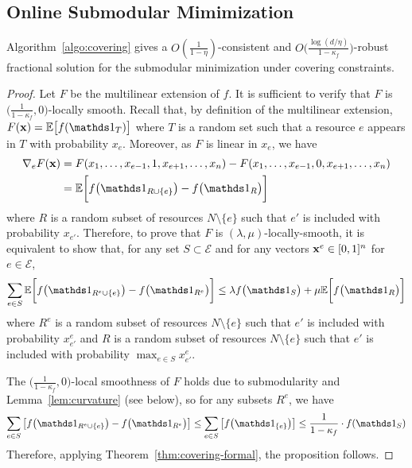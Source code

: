 \subsection{Online Submodular Mimimization}	\label{apix:sub-min}


\begin{proposition}
Algorithm~\ref{algo:covering} gives a
$O(\frac{1}{1 - \eta})$-consistent and $O\bigl( \frac{\log (d/\eta)}{1 - \kappa_{f}} \bigr)$-robust fractional  solution
for the submodular minimization under covering constraints.
\end{proposition}
\begin{proof}
Let $F$ be the multilinear extension of $f$.
It is sufficient to verify that $F$ is $\bigl(\frac{1}{1-\kappa_{f}},0\bigr)$-locally smooth.
Recall that, by definition of the multilinear extension,
$F(\vect{x}) = \mathbb{E} \bigl[ f(\one_{T})\bigr]$ where $T$ is a random set
such that a resource $e$ appears in $T$ with probability $x_{e}$. Moreover, as $F$ is linear in $x_{e}$, we have
%
\begin{align*}
\nabla_{e} F(\vect{x}) %
&= F(x_{1}, \ldots, x_{e-1}, 1, x_{e+1}, \ldots, x_{n}) - F(x_{1}, \ldots, x_{e-1}, 0, x_{e+1}, \ldots, x_{n}) \\
&= \mathbb{E} \biggl[ f\bigl(\one_{R \cup \{e\}}\bigr) - f\bigl(\one_{R}\bigr) \biggr]
\end{align*}
where $R$ is a random subset of resources $N \setminus \{e\}$ such that $e'$ is included with probability $x_{e'}$.
Therefore, to prove that $F$ is $(\lambda,\mu)$-locally-smooth, it is equivalent to show that,
for any set $S \subset \mathcal{E}$ and for any vectors $\mathbf{x}^{e} \in [0,1]^{n}$ for $e \in \mathcal{E}$,
%
\begin{equation*}	\label{eq:min-local-smooth-equiv}
\sum_{e \in S} \mathbb{E} \biggl[ f\bigl(\one_{R^{e} \cup \{e\}}\bigr) - f\bigl(\one_{R^{e}}\bigr) \biggr]
\leq \lambda f\bigl( \one_{S} \bigr) + \mu \mathbb{E} \biggl[ f\bigl(\one_{R}\bigr) \biggr]
\end{equation*}
%
where $R^{e}$ is a random subset of resources $N \setminus \{e\}$ such that $e'$ is included with probability $x^{e}_{e'}$
and $R$ is a random subset of resources $N \setminus \{e\}$ such that $e'$ is included with probability $\max_{e \in S} x^{e}_{e'}$.

The $\bigl(\frac{1}{1-\kappa_{f}},0\bigr)$-local smoothness of $F$ holds due to submodularity and Lemma~\ref{lem:curvature} (see below), so
for any subsets $R^{e}$, we have
\begin{align*}
	\sum_{e \in S} \left[ f\bigl(\one_{R^{e} \cup \{e\}}\bigr) - f\bigl(\one_{R^{e}}\bigr) \right]
		\leq \sum_{e \in S} \left[ f\bigl(\one_{\{e\}}\bigr) \right]
		\leq \frac{1}{1 -\kappa_{f}} \cdot f(\one_{S})
\end{align*}
Therefore, applying Theorem~\ref{thm:covering-formal}, the proposition follows.
\end{proof}

